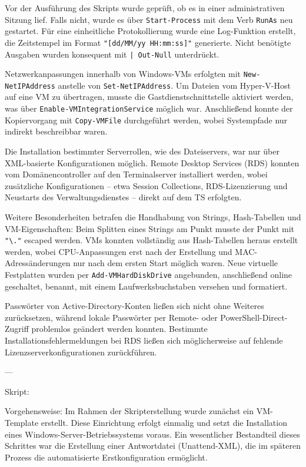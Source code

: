 \documentclass[conference]{IEEEtran}
\begin{document}
Vor der Ausführung des Skripts wurde geprüft, ob es in einer administrativen Sitzung lief. Falls nicht, wurde es über \texttt{Start-Process} mit dem Verb \texttt{RunAs} neu gestartet. Für eine einheitliche Protokollierung wurde eine Log-Funktion erstellt, die Zeitstempel im Format \texttt{"[dd/MM/yy HH:mm:ss]"} generierte. Nicht benötigte Ausgaben wurden konsequent mit \texttt{| Out-Null} unterdrückt.  

Netzwerkanpassungen innerhalb von Windows-VMs erfolgten mit \texttt{New-NetIPAddress} anstelle von \texttt{Set-NetIPAddress}. Um Dateien vom Hyper-V-Host auf eine VM zu übertragen, musste die Gastdienstschnittstelle aktiviert werden, was über \texttt{Enable-VMIntegrationService} möglich war. Anschließend konnte der Kopiervorgang mit \texttt{Copy-VMFile} durchgeführt werden, wobei Systempfade nur indirekt beschreibbar waren.  

Die Installation bestimmter Serverrollen, wie des Dateiservers, war nur über XML-basierte Konfigurationen möglich. Remote Desktop Services (RDS) konnten vom Domänencontroller auf den Terminalserver installiert werden, wobei zusätzliche Konfigurationen -- etwa Session Collections, RDS-Lizenzierung und Neustarts des Verwaltungsdienstes -- direkt auf dem TS erfolgten.  

Weitere Besonderheiten betrafen die Handhabung von Strings, Hash-Tabellen und VM-Eigenschaften: Beim Splitten eines Strings am Punkt musste der Punkt mit \texttt{"\textbackslash."} escaped werden. VMs konnten vollständig aus Hash-Tabellen heraus erstellt werden, wobei CPU-Anpassungen erst nach der Erstellung und MAC-Adressänderungen nur nach dem ersten Start möglich waren. Neue virtuelle Festplatten wurden per \texttt{Add-VMHardDiskDrive} angebunden, anschließend online geschaltet, benannt, mit einem Laufwerksbuchstaben versehen und formatiert.  

Passwörter von Active-Directory-Konten ließen sich nicht ohne Weiteres zurücksetzen, während lokale Passwörter per Remote- oder PowerShell-Direct-Zugriff problemlos geändert werden konnten. Bestimmte Installationsfehlermeldungen bei RDS ließen sich möglicherweise auf fehlende Lizenzserverkonfigurationen zurückführen.

---

Skript:


Vorgehensweise:
Im Rahmen der Skripterstellung wurde zunächst ein VM-Template erstellt. Diese Einrichtung erfolgt einmalig und setzt die Installation eines Windows-Server-Betriebssystems voraus. Ein wesentlicher Bestandteil dieses Schrittes war die Erstellung einer Antwortdatei (Unattend-XML), die im späteren Prozess die automatisierte Erstkonfiguration ermöglicht.
\end{document}
